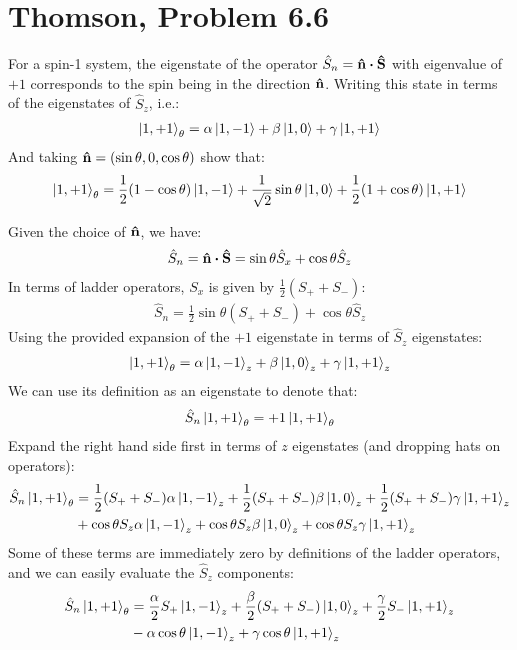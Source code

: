 \documentclass[12pt]{article}
\begin{document}
\section{Thomson, Problem 6.6}
\begin{problem}
  For a spin-1 system, the eigenstate of the operator $\hat{S}_n=\vu{n}\vdot\vu{S}$ with  eigenvalue of $+1$ corresponds to the spin being in the direction $\vu{n}$. Writing this state in terms of the eigenstates of $\hat{S}_z$, i.e.:
  \begin{align*}
    \ket{1,+1}_\theta=\alpha\ket{1,-1}+\beta\ket{1,0}+\gamma\ket{1,+1}
  \end{align*}
  And taking $\vu{n}=(\sin\theta,0,\cos\theta)$ show that:
  \begin{align*}
    \ket{1,+1}_\theta=
    \frac12(1-\cos\theta)\ket{1,-1}
    +\frac1{\sqrt{2}}\sin\theta\ket{1,0}
    +\frac12(1+\cos\theta)\ket{1,+1}
  \end{align*}
\end{problem}
Given the choice of $\vu{n}$, we have:
\begin{align*}
  \hat{S}_n=\vu{n}\vdot\vu{S}=\sin\theta\hat{S}_x+\cos\theta\hat{S}_z
\end{align*}
In terms of ladder operators, $S_x$ is given by $\frac12(S_++S_-)$:
\begin{align*}
  \hat{S}_n=\frac12\sin\theta(S_++S_-)+\cos\theta\hat{S}_z
\end{align*}
Using the provided expansion of the $+1$ eigenstate in terms of $\hat{S}_z$ eigenstates:
\begin{align*}
  \ket{1,+1}_\theta=\alpha\ket{1,-1}_z+\beta\ket{1,0}_z+\gamma\ket{1,+1}_z
\end{align*}
We can use its definition as an eigenstate to denote that:
\begin{align*}
  \hat{S}_n\ket{1,+1}_\theta=+1\ket{1,+1}_\theta
\end{align*}
Expand the right hand side first in terms of $z$ eigenstates (and dropping hats on operators):
\begin{align*}
  \hat{S}_n\ket{1,+1}_\theta&=
  \frac12(S_++S_-)\alpha\ket{1,-1}_z+\frac12(S_++S_-)\beta\ket{1,0}_z+
  \frac12(S_++S_-)\gamma\ket{1,+1}_z\\
  &+\cos\theta S_z\alpha\ket{1,-1}_z+\cos\theta S_z\beta\ket{1,0}_z
  +\cos\theta S_z\gamma\ket{1,+1}_z
\end{align*}
Some of these terms are immediately zero by definitions of the ladder operators, and we can easily evaluate the $\hat{S}_z$ components:
\begin{align*}
  \hat{S}_n\ket{1,+1}_\theta&=
  \frac\alpha2S_+\ket{1,-1}_z+\frac\beta2(S_++S_-)\ket{1,0}_z+
  \frac\gamma2S_-\ket{1,+1}_z\\
  &-\alpha\cos\theta\ket{1,-1}_z+\gamma\cos\theta\ket{1,+1}_z
\end{align*}
\end{document}
